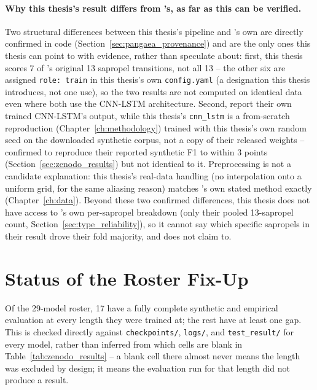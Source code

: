 \paragraph{Why this thesis's result differs from \citet{bury2021}'s, as far as this can be verified.} Two structural differences between this thesis's pipeline and \citet{bury2021}'s own are directly confirmed in code (Section~\ref{sec:pangaea_provenance}) and are the only ones this thesis can point to with evidence, rather than speculate about: first, this thesis scores 7 of \citet{bury2021}'s original 13 sapropel transitions, not all 13 -- the other six are assigned \texttt{role: train} in this thesis's own \texttt{config.yaml} (a designation this thesis introduces, not one \citet{bury2021} use), so the two results are not computed on identical data even where both use the CNN-LSTM architecture. Second, \citet{bury2021} report their own trained CNN-LSTM's output, while this thesis's \texttt{cnn\_lstm} is a from-scratch reproduction (Chapter~\ref{ch:methodology}) trained with this thesis's own random seed on the downloaded synthetic corpus, not a copy of their released weights -- confirmed to reproduce their reported synthetic F1 to within 3 points (Section~\ref{sec:zenodo_results}) but not identical to it. Preprocessing is not a candidate explanation: this thesis's real-data handling (no interpolation onto a uniform grid, for the same aliasing reason) matches \citet{bury2021}'s own stated method exactly (Chapter~\ref{ch:data}). Beyond these two confirmed differences, this thesis does not have access to \citet{bury2021}'s own per-sapropel breakdown (only their pooled 13-sapropel count, Section~\ref{sec:type_reliability}), so it cannot say which specific sapropels in their result drove their fold majority, and does not claim to.

\section{Status of the Roster Fix-Up}
\label{sec:roster_status}
Of the 29-model roster, 17 have a fully complete synthetic and empirical evaluation at every length they were trained at; the rest have at least one gap. This is checked directly against \texttt{checkpoints/}, \texttt{logs/}, and \texttt{test\_result/} for every model, rather than inferred from which cells are blank in Table~\ref{tab:zenodo_results} -- a blank cell there almost never means the length was excluded by design; it means the evaluation run for that length did not produce a result.

